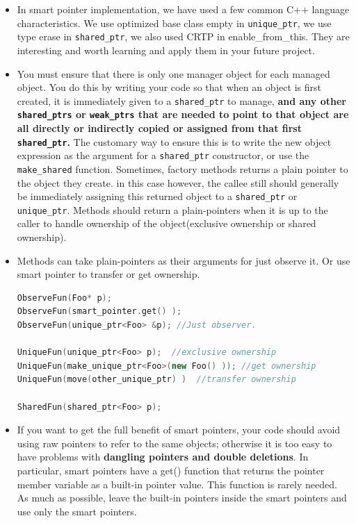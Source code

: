 \documentclass[a4paper,11pt,twoside]{book}
\begin{document}
\begin{itemize}

\item In smart pointer implementation, we have used a few common C++ language characteristics. We use optimized base class empty in \texttt{unique\_ptr}, we use type erase in \texttt{shared\_ptr}, we also used CRTP in enable\_from\_this. They are interesting and worth learning and apply them in your future project. 

\item You must ensure that there is only one manager object for each managed object. You do this by writing your code so that when an object is first created, it is immediately given to a \texttt{shared\_ptr} to manage, \textbf{and any other \texttt{shared\_ptrs} or \texttt{weak\_ptrs} that are needed to point to that object are all directly or indirectly copied or assigned from that first \texttt{shared\_ptr}.} The customary way to ensure this is to write the new object expression as the argument for a \texttt{shared\_ptr} constructor, or use the \texttt{make\_shared} function. Sometimes, factory methods returns a plain pointer to the object they create. in this case however, the callee still should generally be immediately assigning this returned object to a \texttt{shared\_ptr} or \texttt{unique\_ptr}.  Methods should return a plain-pointers when it is up to the caller to handle ownership of the object(exclusive ownership or shared ownership).


\item Methods can take plain-pointers as their arguments for just observe it. Or use smart pointer to transfer or get ownership.
\begin{lstlisting}[frame=single, language=c++]
ObserveFun(Foo* p);
ObserveFun(smart_pointer.get() );
ObserveFun(unique_ptr<Foo> &p); //Just observer.

UniqueFun(unique_ptr<Foo> p);  //exclusive ownership
UniqueFun(make_unique_ptr<Foo>(new Foo() )); //get ownership
UniqueFun(move(other_unique_ptr) )  //transfer ownership

SharedFun(shared_ptr<Foo> p);
\end{lstlisting}

	\item If you want to get the full benefit of smart pointers, your code should avoid using raw pointers to refer to the same objects; otherwise it is too easy to have problems with \textbf{dangling pointers and double deletions}. In particular, smart pointers have a get() function that returns the pointer member variable as a built-in pointer value. This function is rarely needed. As much as possible, leave the built-in pointers inside the smart pointers and use only the smart pointers.



\end{itemize}
\end{document}

